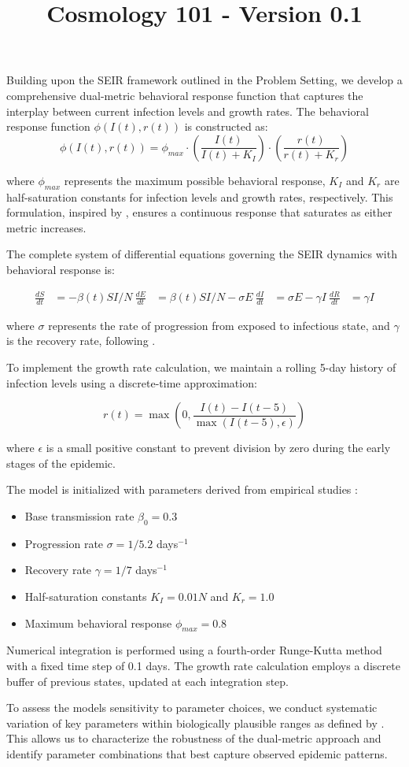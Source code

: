 \documentclass{article}\usepackage{graphicx} \usepackage{amsmath} \usepackage{colortbl}\title{Cosmology 101 - Version 0.1}
\begin{document}
Building upon the SEIR framework outlined in the Problem Setting, we develop a comprehensive dual-metric behavioral response function that captures the interplay between current infection levels and growth rates. The behavioral response function $\phi(I(t), r(t))$ is constructed as:
\begin{equation}
\phi(I(t), r(t)) = \phi_{max} \cdot \left(\frac{I(t)}{I(t) + K_I}\right) \cdot \left(\frac{r(t)}{r(t) + K_r}\right)
\end{equation}

where $\phi_{max}$ represents the maximum possible behavioral response, $K_I$ and $K_r$ are half-saturation constants for infection levels and growth rates, respectively. This formulation, inspired by \cite{funk2010modelling}, ensures a continuous response that saturates as either metric increases.

The complete system of differential equations governing the SEIR dynamics with behavioral response is:

\begin{align}
\frac{dS}{dt} &= -\beta(t)SI/N \
\frac{dE}{dt} &= \beta(t)SI/N - \sigma E \
\frac{dI}{dt} &= \sigma E - \gamma I \
\frac{dR}{dt} &= \gamma I
\end{align}

where $\sigma$ represents the rate of progression from exposed to infectious state, and $\gamma$ is the recovery rate, following \cite{anderson1992infectious}.

To implement the growth rate calculation, we maintain a rolling 5-day history of infection levels using a discrete-time approximation:

\begin{equation}
r(t) = \max\left(0, \frac{I(t) - I(t-5)}{\max(I(t-5), \epsilon)}\right)
\end{equation}

where $\epsilon$ is a small positive constant to prevent division by zero during the early stages of the epidemic.

The model is initialized with parameters derived from empirical studies \cite{hethcote2000mathematics}:
\begin{itemize}
\item Base transmission rate $\beta_0 = 0.3$
\item Progression rate $\sigma = 1/5.2$ days$^{-1}$
\item Recovery rate $\gamma = 1/7$ days$^{-1}$
\item Half-saturation constants $K_I = 0.01N$ and $K_r = 1.0$
\item Maximum behavioral response $\phi_{max} = 0.8$
\end{itemize}

Numerical integration is performed using a fourth-order Runge-Kutta method with a fixed time step of 0.1 days. The growth rate calculation employs a discrete buffer of previous states, updated at each integration step.

To assess the models sensitivity to parameter choices, we conduct systematic variation of key parameters within biologically plausible ranges as defined by \cite{verelst2016behavioural}. This allows us to characterize the robustness of the dual-metric approach and identify parameter combinations that best capture observed epidemic patterns.
\end{document}
